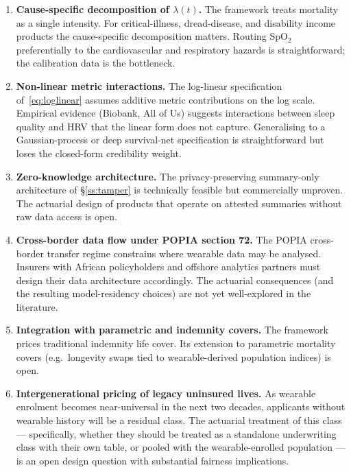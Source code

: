 \begin{enumerate}[leftmargin=*,nosep,topsep=4pt]
   \item \textbf{Cause-specific decomposition of $\lambda(t)$.}
         The framework treats mortality as a single intensity. For
         critical-illness, dread-disease, and disability income
         products the cause-specific decomposition matters.
         Routing SpO$_2$ preferentially to the cardiovascular and
         respiratory hazards is straightforward; the calibration
         data is the bottleneck.
   \item \textbf{Non-linear metric interactions.} The log-linear
         specification of~\eqref{eq:loglinear} assumes additive
         metric contributions on the log scale. Empirical
         evidence (Biobank, All of Us) suggests interactions
         between sleep quality and HRV that the linear form does
         not capture. Generalising to a Gaussian-process or deep
         survival-net specification is straightforward but loses
         the closed-form credibility weight.
   \item \textbf{Zero-knowledge architecture.} The privacy-preserving
         summary-only architecture of \S\ref{ss:tamper} is technically
         feasible but commercially unproven. The actuarial design of
         products that operate on attested summaries without raw data
         access is open.
   \item \textbf{Cross-border data flow under POPIA section 72.}
         The POPIA cross-border transfer regime constrains where
         wearable data may be analysed. Insurers with African
         policyholders and offshore analytics partners must
         design their data architecture accordingly. The actuarial
         consequences (and the resulting model-residency choices)
         are not yet well-explored in the literature.
   \item \textbf{Integration with parametric and indemnity covers.}
         The framework prices traditional indemnity life cover. Its
         extension to parametric mortality covers (e.g.\ longevity
         swaps tied to wearable-derived population indices) is open.
   \item \textbf{Intergenerational pricing of legacy uninsured
         lives.} As wearable enrolment becomes near-universal in the
         next two decades, applicants without wearable history will
         be a residual class. The actuarial treatment of this class
         --- specifically, whether they should be treated as a
         standalone underwriting class with their own table, or
         pooled with the wearable-enrolled population --- is an
         open design question with substantial fairness
         implications.
\end{enumerate}

